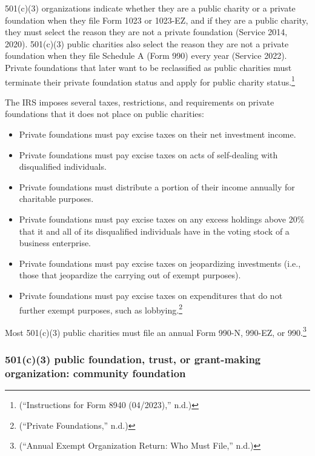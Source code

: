 \documentclass[
  letterpaper,
  DIV=11,
  numbers=noendperiod]{scrreprt}
\begin{document}
501(c)(3) organizations indicate whether they are a public charity or a
private foundation when they file Form 1023 or 1023-EZ, and if they are
a public charity, they must select the reason they are not a private
foundation (Service 2014, 2020). 501(c)(3) public charities also select
the reason they are not a private foundation when they file Schedule A
(Form 990) every year (Service 2022). Private foundations that later
want to be reclassified as public charities must terminate their private
foundation status and apply for public charity status.\footnote{({``Instructions
  for Form 8940 (04/2023),''} n.d.)}

The IRS imposes several taxes, restrictions, and requirements on private
foundations that it does not place on public charities:

\begin{itemize}
\item
  Private foundations must pay excise taxes on their net investment
  income.
\item
  Private foundations must pay excise taxes on acts of self-dealing with
  disqualified individuals.
\item
  Private foundations must distribute a portion of their income annually
  for charitable purposes.
\item
  Private foundations must pay excise taxes on any excess holdings above
  20\% that it and all of its disqualified individuals have in the
  voting stock of a business enterprise.
\item
  Private foundations must pay excise taxes on jeopardizing investments
  (i.e., those that jeopardize the carrying out of exempt purposes).
\item
  Private foundations must pay excise taxes on expenditures that do not
  further exempt purposes, such as lobbying.\footnote{({``Private
    Foundations,''} n.d.)}
\end{itemize}

Most 501(c)(3) public charities must file an annual Form 990-N, 990-EZ,
or 990.\footnote{({``Annual Exempt Organization Return: Who Must
  File,''} n.d.)}

\hypertarget{c3-public-foundation-trust-or-grant-making-organization-community-foundation}{%
\subsubsection{501(c)(3) public foundation, trust, or grant-making
organization: community
foundation}\label{c3-public-foundation-trust-or-grant-making-organization-community-foundation}}
\end{document}
